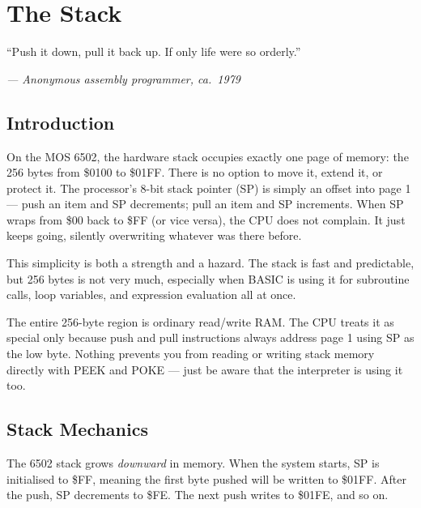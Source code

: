 \chapter{The Stack}

\epigraph{``Push it down, pull it back up.  If only life were so
orderly.''}{\textit{--- Anonymous assembly programmer, ca.\ 1979}}

\section*{Introduction}

On the MOS 6502, the hardware stack occupies exactly one page of memory: the
256 bytes from \$0100 to \$01FF.  There is no option to move it, extend it, or
protect it.  The processor's 8-bit stack pointer (SP) is simply an offset into
page 1 --- push an item and SP decrements; pull an item and SP increments.
When SP wraps from \$00 back to \$FF (or vice versa), the CPU does not complain.
It just keeps going, silently overwriting whatever was there before.

This simplicity is both a strength and a hazard.  The stack is fast and
predictable, but 256 bytes is not very much, especially when BASIC is using it
for subroutine calls, loop variables, and expression evaluation all at once.


The entire 256-byte region is ordinary read/write RAM.  The CPU treats it as
special only because push and pull instructions always address page 1 using SP
as the low byte.  Nothing prevents you from reading or writing stack memory
directly with PEEK and POKE --- just be aware that the interpreter is using it
too.

\section{Stack Mechanics}

The 6502 stack grows \emph{downward} in memory.  When the system starts, SP is
initialised to \$FF, meaning the first byte pushed will be written to \$01FF.
After the push, SP decrements to \$FE.  The next push writes to \$01FE, and so
on.

